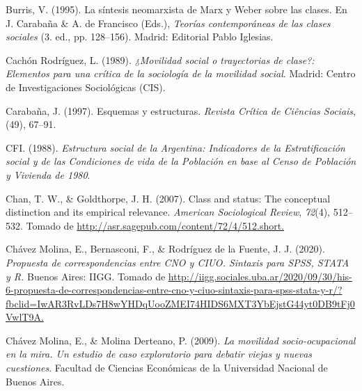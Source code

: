\documentclass[
]{article}
\newlength{\cslhangindent}
\newlength{\cslentryspacingunit} %
\newenvironment{CSLReferences}[2] %
 {%
  \setlength{\parindent}{0pt}
  \ifodd #1
  \let\oldpar\par
  \def\par{\hangindent=\cslhangindent\oldpar}
  \fi
  \setlength{\parskip}{#2\cslentryspacingunit}
 }%
 {}
\begin{document}
\begin{CSLReferences}{1}{0}
\leavevmode{}%
Burris, V. (1995). La síntesis neomarxista de {Marx} y {Weber} sobre las clases. En J. Carabaña \& A. de Francisco (Eds.), \emph{Teorías contemporáneas de las clases sociales} (3. ed., pp. 128--156). Madrid: Editorial Pablo Iglesias.

\leavevmode{}%
Cachón Rodríguez, L. (1989). \emph{¿{Movilidad} social o trayectorias de clase?: Elementos para una crítica de la sociología de la movilidad social}. Madrid: Centro de Investigaciones Sociológicas (CIS).

\leavevmode{}%
Carabaña, J. (1997). Esquemas y estructuras. \emph{Revista Crítica de Ciências Sociais}, (49), 67--91.

\leavevmode{}%
CFI. (1988). \emph{Estructura social de la {Argentina}: Indicadores de la {Estratificación} social y de las {Condiciones} de vida de la {Población} en base al {Censo} de {Población} y {Vivienda} de 1980}.

\leavevmode{}%
Chan, T. W., \& Goldthorpe, J. H. (2007). Class and status: The conceptual distinction and its empirical relevance. \emph{American Sociological Review}, \emph{72}(4), 512--532. Tomado de \href{http://asr.sagepub.com/content/72/4/512.short}{http://asr.sagepub.com/content/72/4/512.short.}

\leavevmode{}%
Chávez Molina, E., Bernasconi, F., \& Rodríguez de la Fuente, J. J. (2020). \emph{Propuesta de correspondencias entre {CNO} y {CIUO}. {Sintaxis} para {SPSS}, {STATA} y {R}.} Buenos Aires: IIGG. Tomado de \href{http://iigg.sociales.uba.ar/2020/09/30/his-6-propuesta-de-correspondencias-entre-cno-y-ciuo-sintaxis-para-spss-stata-y-r/?fbclid=IwAR3RvLDs7H8wYHDqUooZMEI74HIDS6MXT3YbEjstG44yt0DB9tFj0VwlT9A}{http://iigg.sociales.uba.ar/2020/09/30/his-6-propuesta-de-correspondencias-entre-cno-y-ciuo-sintaxis-para-spss-stata-y-r/?fbclid=IwAR3RvLDs7H8wYHDqUooZMEI74HIDS6MXT3YbEjstG44yt0DB9tFj0VwlT9A.}

\leavevmode{}%
Chávez Molina, E., \& Molina Derteano, P. (2009). \emph{La movilidad socio-ocupacional en la mira. {Un} estudio de caso exploratorio para debatir viejas y nuevas cuestiones}. Facultad de Ciencias Económicas de la Universidad Nacional de Buenos Aires.


\end{CSLReferences}
\end{document}
